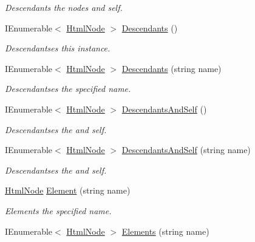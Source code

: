 \begin{DoxyCompactItemize}
\begin{DoxyCompactList}\small\item\em Descendants the nodes and self. \end{DoxyCompactList}\item 
I\+Enumerable$<$ \hyperlink{class_html_agility_pack_1_1_html_node}{Html\+Node} $>$ \hyperlink{class_html_agility_pack_1_1_html_node_a33b417336b8282b4240007b636513afa}{Descendants} ()
\begin{DoxyCompactList}\small\item\em Descendantses this instance. \end{DoxyCompactList}\item 
I\+Enumerable$<$ \hyperlink{class_html_agility_pack_1_1_html_node}{Html\+Node} $>$ \hyperlink{class_html_agility_pack_1_1_html_node_a8ff51a9f8d637df9ed69c68b235c1694}{Descendants} (string name)
\begin{DoxyCompactList}\small\item\em Descendantses the specified name. \end{DoxyCompactList}\item 
I\+Enumerable$<$ \hyperlink{class_html_agility_pack_1_1_html_node}{Html\+Node} $>$ \hyperlink{class_html_agility_pack_1_1_html_node_af2d47d0113e0f08967096c362e12c5d7}{Descendants\+And\+Self} ()
\begin{DoxyCompactList}\small\item\em Descendantses the and self. \end{DoxyCompactList}\item 
I\+Enumerable$<$ \hyperlink{class_html_agility_pack_1_1_html_node}{Html\+Node} $>$ \hyperlink{class_html_agility_pack_1_1_html_node_a7e08733bc7087a8e81b56316e67cb325}{Descendants\+And\+Self} (string name)
\begin{DoxyCompactList}\small\item\em Descendantses the and self. \end{DoxyCompactList}\item 
\hyperlink{class_html_agility_pack_1_1_html_node}{Html\+Node} \hyperlink{class_html_agility_pack_1_1_html_node_ad6ff37ffc534bd5ba0c90ca373516cc3}{Element} (string name)
\begin{DoxyCompactList}\small\item\em Elements the specified name. \end{DoxyCompactList}\item 
I\+Enumerable$<$ \hyperlink{class_html_agility_pack_1_1_html_node}{Html\+Node} $>$ \hyperlink{class_html_agility_pack_1_1_html_node_a601bdf7d0b7e6a266c3f5540fdd9affc}{Elements} (string name)

\end{DoxyCompactItemize}
